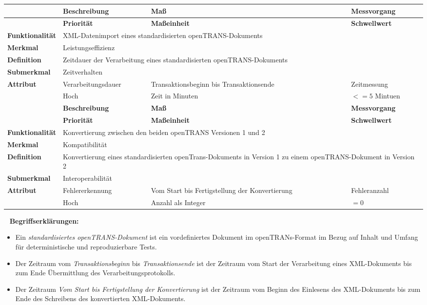 \begin{tabularx}{\textwidth}{ p{70pt} | X | X | X }
	\hline
	& \textbf{Beschreibung} & \textbf{Maß} & \textbf{Messvorgang} \\ \hline
	& \textbf{Priorität} & \textbf{Maßeinheit} & \textbf{Schwellwert} \\ \hline
	\textbf{Funktionalität} & \multicolumn{3}{p{300pt}}{XML-Datenimport eines standardisierten openTRANS-Dokuments} \\ \hline
	\textbf{Merkmal} & \multicolumn{3}{X}{Leistungseffizienz} \\ \hline
	\textbf{Definition} & \multicolumn{3}{p{380pt}}{Zeitdauer der Verarbeitung eines standardisierten openTRANS-Dokuments} \\ \hline
	\textbf{Submerkmal} & \multicolumn{3}{X}{Zeitverhalten} \\ \hline 
	\textbf{Attribut} & Verarbeitungsdauer & Transaktionsbeginn bis Transaktionsende & Zeitmessung  \\ \hline
	               & Hoch               & Zeit in Minuten & $<= 5$ Mintuen  \\ 
    \hline 
    \hline 
	& \textbf{Beschreibung} & \textbf{Maß} & \textbf{Messvorgang} \\ \hline
	& \textbf{Priorität} & \textbf{Maßeinheit} & \textbf{Schwellwert} \\ \hline
	\textbf{Funktionalität} & \multicolumn{3}{p{300pt}}{Konvertierung zwischen den beiden openTRANS Versionen 1 und 2} \\ \hline
	\textbf{Merkmal} & \multicolumn{3}{X}{Kompatibilität} \\ \hline
	\textbf{Definition} & \multicolumn{3}{p{380pt}}{Konvertierung eines standardisierten openTrans-Dokuments in Version 1 zu einem openTRANS-Dokument in Version 2} \\ \hline
	\textbf{Submerkmal} & \multicolumn{3}{X}{Interoperabilität} \\ \hline 
	\textbf{Attribut} & Fehlererkennung & Vom Start bis Fertigstellung der Konvertierung  & Fehleranzahl  \\ \hline
	& Hoch               & Anzahl als Integer & $= 0$  \\ \hline
\end{tabularx}
\egroup
\ \newline
\newline
\textbf{Begriffserklärungen:}
\begin{itemize}
	\item Ein \emph{standardisiertes openTRANS-Dokument} ist ein vordefiniertes Dokument im openTRANs-Format im Bezug auf Inhalt und Umfang für deterministische und reproduzierbare Tests.
	\item Der Zeitraum vom \emph{Transaktionsbeginn} bis \emph{Transaktionsende} ist der Zeitraum vom Start der Verarbeitung eines XML-Dokuments bis zum Ende Übermittlung des Verarbeitungsprotokolls.
	\item Der Zeitraum \emph{Vom Start bis Fertigstellung der Konvertierung} ist der Zeitraum vom Beginn des Einlesens des XML-Dokuments bis zum Ende des Schreibens des konvertierten XML-Dokuments.
\end{itemize}
\newpage
